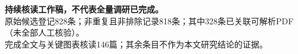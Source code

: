\textbf{持续核读工作稿，不代表全量调研已完成。}\\[5pt]
原始候选登记828条；非重复且非排除记录818条；其中328条已关联可解析PDF（未全部人工核验）。\\[5pt]
完成全文与关键图表核读146篇；其余条目不作为本文研究结论的证据。
